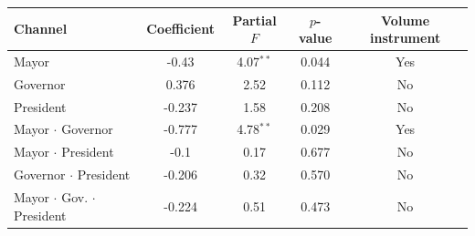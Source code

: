 \begin{tabular}{@{}lcccc@{}}
\toprule
Channel & Coefficient & Partial $F$ & $p$-value & Volume instrument \\
\midrule
Mayor & -0.43 & 4.07$^{**}$ & 0.044 & Yes \\
Governor & 0.376 & 2.52 & 0.112 & No \\
President & -0.237 & 1.58 & 0.208 & No \\
Mayor $\cdot$ Governor & -0.777 & 4.78$^{**}$ & 0.029 & Yes \\
Mayor $\cdot$ President & -0.1 & 0.17 & 0.677 & No \\
Governor $\cdot$ President & -0.206 & 0.32 & 0.570 & No \\
Mayor $\cdot$ Gov. $\cdot$ President & -0.224 & 0.51 & 0.473 & No \\
\bottomrule
\end{tabular}
